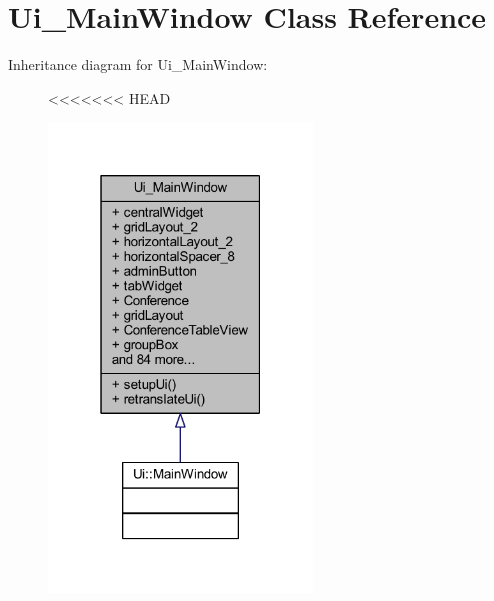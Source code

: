 \hypertarget{class_ui___main_window}{}\section{Ui\+\_\+\+Main\+Window Class Reference}
\label{class_ui___main_window}


Inheritance diagram for Ui\+\_\+\+Main\+Window\+:
\nopagebreak
\begin{figure}[H]
<<<<<<< HEAD
\begin{center}
\leavevmode
\includegraphics[width=199pt]{class_ui___main_window__inherit__graph}
\end{center}
\end{figure}


